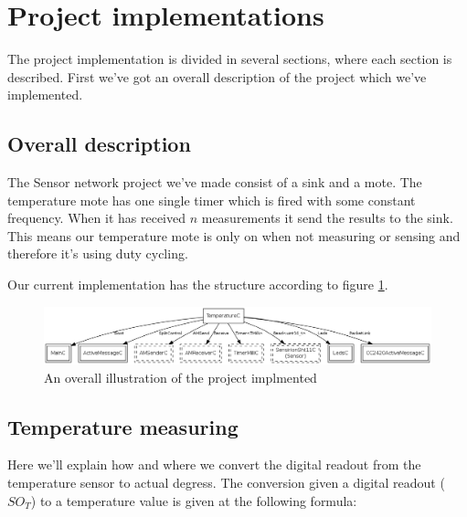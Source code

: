 \section{Project implementations}

The project implementation is divided in several sections, where each section
is described. First we've got an overall description of the project which we've
implemented.

\subsection{Overall description}
The Sensor network project we've made consist of a sink and a mote. The
temperature mote has one single timer which is fired with some constant
frequency. When it has received $n$ measurements it send the results to the
sink. This means our temperature mote is only on when not measuring or sensing
and therefore it's using duty cycling. 

Our current implementation has the structure according to figure \ref{fig:overalloverview}.
\begin{figure}[htbp]
   \centering
   \includegraphics[width=17cm]{img/TemperatureAppC.png} 
   \caption{An overall illustration of the project implmented}
   \label{fig:overalloverview}
\end{figure}

\subsection{Temperature measuring}
Here we'll explain how and where we convert the digital readout from the
temperature sensor to actual degress. The conversion given a digital readout
($SO_{T}$) to a temperature value is given at the following
formula\cite{temperature}:

